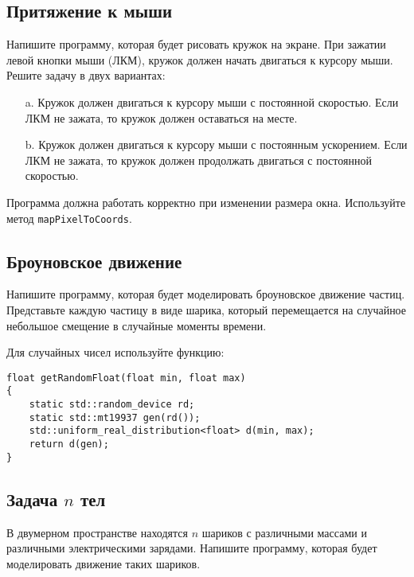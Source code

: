 \documentclass{article}
\begin{document}
\subsection{Притяжение к мыши}
Напишите программу, которая будет рисовать кружок на экране.
При зажатии левой кнопки мыши (ЛКМ), кружок должен начать двигаться к курсору мыши. Решите задачу в двух вариантах:
\begin{enumerate}
\item[a.] Кружок должен двигаться к курсору мыши с постоянной скоростью. Если ЛКМ не зажата, то кружок должен оставаться на месте.
\item[b.] Кружок должен двигаться к курсору мыши с постоянным ускорением. Если ЛКМ не зажата, то кружок должен продолжать двигаться с постоянной скоростью.
\end{enumerate}
Программа должна работать корректно при изменении размера окна. Используйте метод \texttt{mapPixelToCoords}.


\clearpage
\subsection{Броуновское движение}
Напишите программу, которая будет моделировать броуновское движение частиц. Представьте каждую частицу в виде шарика, который перемещается на случайное небольшое смещение в случайные моменты времени.

Для случайных чисел используйте функцию:
\begin{lstlisting}
float getRandomFloat(float min, float max)
{
    static std::random_device rd;
    static std::mt19937 gen(rd());
    std::uniform_real_distribution<float> d(min, max);
    return d(gen);
}
\end{lstlisting}

\subsection{Задача $n$ тел}
В двумерном пространстве находятся $n$ шариков с различными массами и различными электрическими зарядами. Напишите программу, которая будет моделировать движение таких шариков.\\
\end{document}
